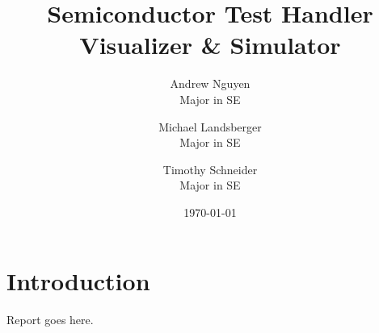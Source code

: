 \documentclass{report}
\title{Semiconductor Test Handler Visualizer \& Simulator}
\author{
    Andrew Nguyen \\
    Major in SE
    \and
    Michael Landsberger \\
    Major in SE
    \and
    Timothy Schneider \\
    Major in SE
}
\date{\today}
\begin{document}
\maketitle

\chapter{Introduction}
Report goes here.
\end{document}
